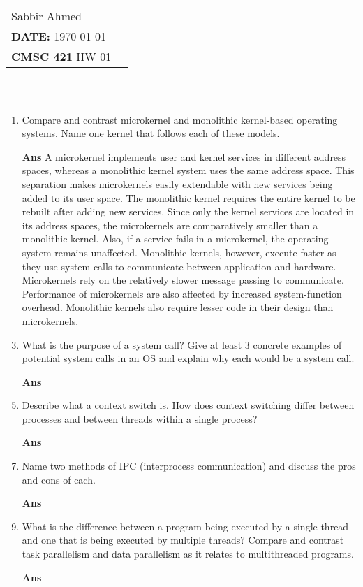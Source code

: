 \documentclass[paper=usletter, fontsize=12pt]{extarticle}
\newcommand{\documentinfo}[5]{
    \begin{centering}
        \parbox{2in}{
        \begin{spacing}{1}
            \begin{flushleft}
                \begin{tabular}{l l}
                    #1 \\
                    #2 \\
                    #3 \\
                \end{tabular}\\
                \rule{\textwidth}{1pt}
            \end{flushleft}
        \end{spacing}
        }
    \end{centering}
}
\begin{document}
    \documentinfo{Sabbir Ahmed}{\textbf{DATE:} \today}{\textbf{CMSC 421} HW 01}
    \vspace{-0.2in}

    \begin{enumerate}[label=\textbf{\arabic*}]

        \item Compare and contrast microkernel and monolithic kernel-based
        operating systems. Name one kernel that follows each of these models.
        \item[\textbf{Ans}]
        A microkernel implements user and kernel services in different address
        spaces, whereas a monolithic kernel system uses the same address space.
        This separation makes microkernels easily extendable with new services
        being added to its user space. The monolithic kernel requires the
        entire kernel to be rebuilt after adding new services. Since only the
        kernel services are located in its address spaces, the microkernels are
        comparatively smaller than a monolithic kernel. Also, if a service
        fails in a microkernel, the operating system remains unaffected.
        Monolithic kernels, however, execute faster as they use system calls to
        communicate between application and hardware. Microkernels rely on the
        relatively slower message passing to communicate. Performance of
        microkernels are also affected by increased system-function overhead.
        Monolithic kernels also require lesser code in their design than
        microkernels.
        \vspace{0.2in}

        \item What is the purpose of a system call? Give at least 3 concrete
        examples of potential system calls in an OS and explain why each would
        be a system call.
        \item[\textbf{Ans}]

        \item Describe what a context switch is. How does context switching
        differ between processes and between threads within a single process?
        \item[\textbf{Ans}]

        \item Name two methods of IPC (interprocess communication) and discuss
        the pros and cons of each.
        \item[\textbf{Ans}]

        \item What is the difference between a program being executed by a
        single thread and one that is being executed by multiple threads?
        Compare and contrast task parallelism and data parallelism as it
        relates to multithreaded programs.
        \item[\textbf{Ans}]

    \end{enumerate}
\end{document}
